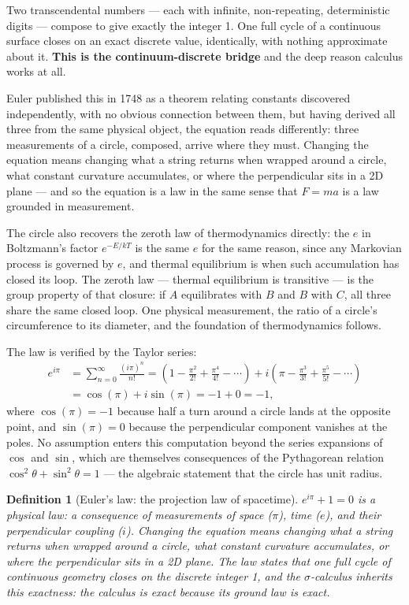 \documentclass[12pt]{article}
\newtheorem{definition}[theorem]{Definition}
\begin{document}
Two transcendental numbers --- each with infinite, non-repeating, deterministic digits --- compose to give exactly the integer 1. One full cycle of a continuous surface closes on an exact discrete value, identically, with nothing approximate about it. \textbf{This is the continuum-discrete bridge }and the deep reason calculus works at all.

Euler published this in 1748 as a theorem relating constants discovered independently, with no obvious connection between them, but having derived all three from the same physical object, the equation reads differently: three measurements of a circle, composed, arrive where they must. Changing the equation means changing what a string returns when wrapped around a circle, what constant curvature accumulates, or where the perpendicular sits in a 2D plane --- and so the equation is a law in the same sense that $F = ma$ is a law grounded in measurement.

The circle also recovers the zeroth law of thermodynamics directly: the $e$ in Boltzmann's factor $e^{-E/kT}$ is the same $e$ for the same reason, since any Markovian process is governed by $e$, and thermal equilibrium is when such accumulation has closed its loop. The zeroth law --- thermal equilibrium is transitive --- is the group property of that closure: if $A$ equilibrates with $B$ and $B$ with $C$, all three share the same closed loop. One physical measurement, the ratio of a circle's circumference to its diameter, and the foundation of thermodynamics follows.

The law is verified by the Taylor series:
\begin{align}
    e^{i\pi} &= \sum_{n=0}^{\infty} \frac{(i\pi)^n}{n!}
    = \left(1 - \frac{\pi^2}{2!} + \frac{\pi^4}{4!} - \cdots\right)
     + i\left(\pi - \frac{\pi^3}{3!} + \frac{\pi^5}{5!} - \cdots\right) \nonumber \\
    &= \cos(\pi) + i\sin(\pi) = -1 + 0 = -1,
\end{align}
where $\cos(\pi) = -1$ because half a turn around a circle lands at the opposite point, and $\sin(\pi) = 0$ because the perpendicular component vanishes at the poles. No assumption enters this computation beyond the series expansions of $\cos$ and $\sin$, which are themselves consequences of the Pythagorean relation $\cos^2\theta + \sin^2\theta = 1$ --- the algebraic statement that the circle has unit radius.

\begin{definition}[Euler's law: the projection law of spacetime]
    $e^{i\pi} + 1 = 0$ is a physical law: a consequence of measurements of space ($\pi$), time ($e$), and their perpendicular coupling ($i$). Changing the equation means changing what a string returns when wrapped around a circle, what constant curvature accumulates, or where the perpendicular sits in a 2D plane. The law states that one full cycle of continuous geometry closes on the discrete integer 1, and the $\sigma$-calculus inherits this exactness: the calculus is exact because its ground law is exact.
\end{definition}
\end{document}
